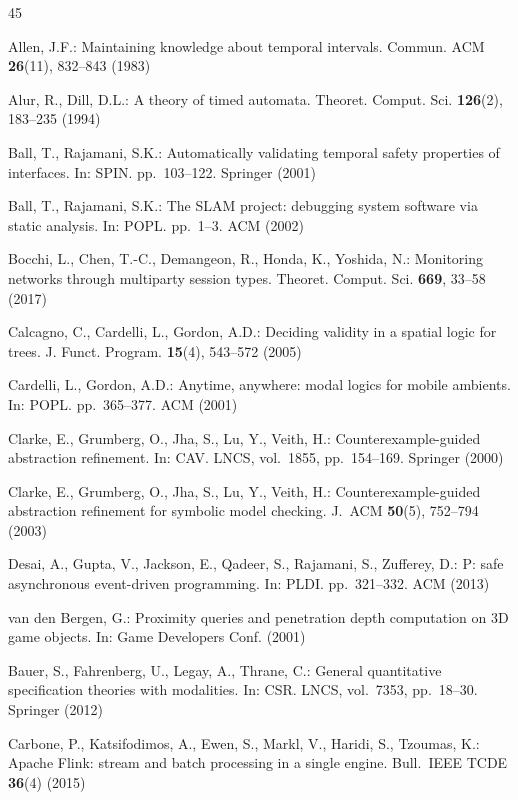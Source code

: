 \documentclass[11pt,a4paper]{article}
\begin{document}
\begin{thebibliography}{45}

Allen, J.F.: Maintaining knowledge about temporal intervals.
Commun. ACM \textbf{26}(11), 832--843 (1983)

Alur, R., Dill, D.L.: A theory of timed automata.
Theoret. Comput. Sci. \textbf{126}(2), 183--235 (1994)

Ball, T., Rajamani, S.K.: Automatically validating temporal safety properties
of interfaces. In: SPIN. pp.~103--122. Springer (2001)

Ball, T., Rajamani, S.K.: The SLAM project: debugging system software via
static analysis. In: POPL. pp.~1--3. ACM (2002)

Bocchi, L., Chen, T.-C., Demangeon, R., Honda, K., Yoshida, N.:
Monitoring networks through multiparty session types.
Theoret. Comput. Sci. \textbf{669}, 33--58 (2017)

Calcagno, C., Cardelli, L., Gordon, A.D.: Deciding validity in a spatial logic
for trees. J. Funct. Program. \textbf{15}(4), 543--572 (2005)

Cardelli, L., Gordon, A.D.: Anytime, anywhere: modal logics for mobile ambients.
In: POPL. pp.~365--377. ACM (2001)

Clarke, E., Grumberg, O., Jha, S., Lu, Y., Veith, H.:
Counterexample-guided abstraction refinement.
In: CAV. LNCS, vol.~1855, pp.~154--169. Springer (2000)

Clarke, E., Grumberg, O., Jha, S., Lu, Y., Veith, H.:
Counterexample-guided abstraction refinement for symbolic model checking.
J.~ACM \textbf{50}(5), 752--794 (2003)

Desai, A., Gupta, V., Jackson, E., Qadeer, S., Rajamani, S., Zufferey, D.:
P: safe asynchronous event-driven programming.
In: PLDI. pp.~321--332. ACM (2013)

van den Bergen, G.: Proximity queries and penetration depth computation on 3D
game objects. In: Game Developers Conf. (2001)

Bauer, S., Fahrenberg, U., Legay, A., Thrane, C.: General quantitative specification theories with
modalities. In: CSR. LNCS, vol.~7353, pp.~18--30. Springer (2012)

Carbone, P., Katsifodimos, A., Ewen, S., Markl, V., Haridi, S., Tzoumas, K.:
Apache Flink: stream and batch processing in a single engine.
Bull.\ IEEE TCDE \textbf{36}(4) (2015)


\end{thebibliography}
\end{document}
